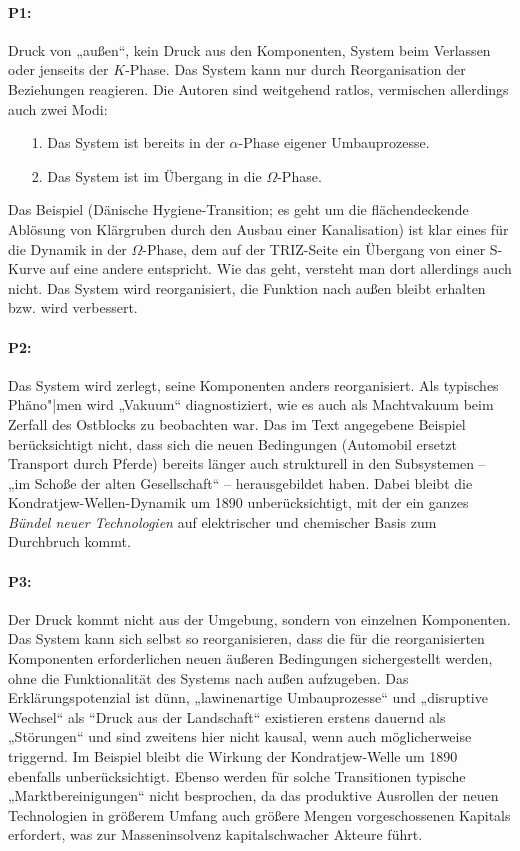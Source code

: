 \documentclass[12pt,a4paper]{article}
\begin{document}
\paragraph{P1:}
Druck von „außen“, kein Druck aus den Komponenten, System beim Verlassen oder
jenseits der $K$-Phase.  Das System kann nur durch Reorganisation der
Beziehungen reagieren.  Die Autoren sind weitgehend ratlos, vermischen
allerdings auch zwei Modi:
\begin{itemize}
\item[1.] Das System ist bereits in der $\alpha$-Phase eigener Umbauprozesse.
\item[2.] Das System ist im Übergang in die $\Omega$-Phase.
\end{itemize}
Das Beispiel (Dänische Hygiene-Transition; es geht um die flächendeckende
Ablösung von Klärgruben durch den Ausbau einer Kanalisation) ist klar eines
für die Dynamik in der $\Omega$-Phase, dem auf der TRIZ-Seite ein Übergang von
einer S-Kurve auf eine andere entspricht. Wie das geht, versteht man dort
allerdings auch nicht.  Das System wird reorganisiert, die Funktion nach außen
bleibt erhalten bzw. wird verbessert.

\paragraph{P2:}
Das System wird zerlegt, seine Komponenten anders reorganisiert.  Als
typisches Phäno"|men wird „Vakuum“ diagnostiziert, wie es auch als Machtvakuum
beim Zerfall des Ostblocks zu beobachten war. Das im Text angegebene Beispiel
berücksichtigt nicht, dass sich die neuen Bedingungen (Automobil ersetzt
Transport durch Pferde) bereits länger auch strukturell in den Subsystemen --
„im Schoße der alten Gesellschaft“ -- herausgebildet haben. Dabei bleibt die
Kondratjew-Wellen-Dynamik um 1890 unberücksichtigt, mit der ein ganzes
\emph{Bündel neuer Technologien} auf elektrischer und chemischer Basis zum
Durchbruch kommt.

\paragraph{P3:}
Der Druck kommt nicht aus der Umgebung, sondern von einzelnen Komponenten. Das
System kann sich selbst so reorganisieren, dass die für die reorganisierten
Komponenten erforderlichen neuen äußeren Bedingungen sichergestellt werden,
ohne die Funktionalität des Systems nach außen aufzugeben.  Das
Erklärungspotenzial ist dünn, „lawinenartige Umbauprozesse“ und „disruptive
Wechsel“ als “Druck aus der Landschaft“ existieren erstens dauernd als
„Störungen“ und sind zweitens hier nicht kausal, wenn auch möglicherweise
triggernd. Im Beispiel bleibt die Wirkung der Kondratjew-Welle um 1890
ebenfalls unberücksichtigt.  Ebenso werden für solche Transitionen typische
„Marktbereinigungen“ nicht besprochen, da das produktive Ausrollen der neuen
Technologien in größerem Umfang auch größere Mengen vorgeschossenen Kapitals
erfordert, was zur Masseninsolvenz kapitalschwacher Akteure führt.
\end{document}
